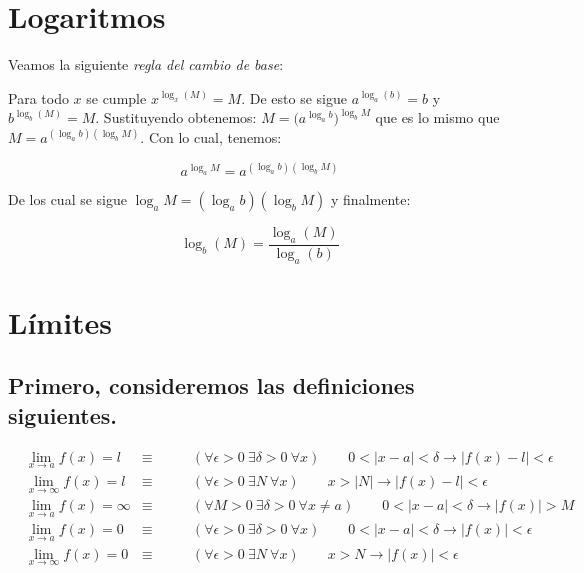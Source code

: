 \message{ !name(analisis-mat.tex)}\documentclass[12pt,a4paper]{article}
\begin{document}


\section{Logaritmos}
Veamos la siguiente \emph{regla del cambio de base}:

Para todo \( x \)  se cumple \( x^{\log_x(M)} = M \). De esto se sigue
\( a^{\log_a(b)} = b \) y \( b^{\log_b(M)} = M \). Sustituyendo
obtenemos: \(M= \big(a^{\log_a b}\big)^{\log_b M} \) que es lo mismo que
\(M= a^{(\log_a b)(\log_b M)}   \). Con lo cual, tenemos:


\[a^{\log_a M} = a^{(\log_a b)(\log_b M)} \]

De los cual se sigue \( \log_a M = (\log_a b)(\log_b M) \)  y
finalmente:

\begin{equation}
\log_b(M) = \frac{\log_a(M)}{\log_a(b)}
\end{equation}


\section{L\'imites}

\subsection{Primero, consideremos las definiciones siguientes.}
\vspace{.5cm}


\begin{align*}
&\lim_{x \to a}f(x) = l  &  \equiv \qquad  &
( \forall \epsilon > 0 \ \exists \delta > 0 \ \forall x)  \qquad   0<|x-a|< \delta  \to  |f(x) - l| <
\epsilon  & \\
&\lim_{x \to \infty}f(x) = l  &  \equiv  \qquad &
(\forall \epsilon > 0 \ \exists N \ \forall x) \qquad  x > |N|  \to
 |f(x) - l| < \epsilon & \\
&\lim_{x \to a}f(x) = \infty  &  \equiv \qquad  &
(\forall M > 0 \ \exists \delta > 0 \ \forall x \neq a) \qquad   0<|x-a| < \delta  \to  |f(x)| >
M  & \\
&\lim_{x \to a}f(x) = 0  &  \equiv   \qquad  &
(\forall \epsilon > 0 \ \exists \delta > 0 \ \forall x) \qquad   0<|x-a| < \delta  \to  |f(x)| <
\epsilon & \\
&\lim_{x \to \infty}f(x) = 0  &  \equiv \qquad  &
(\forall \epsilon > 0 \ \exists N \ \forall x) \qquad   x > N  \to
 |f(x)| < \epsilon & \\
\end{align*}
\end{document}

